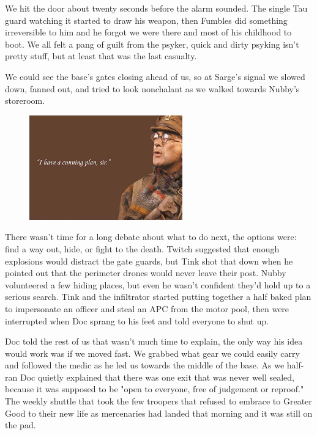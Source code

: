 We hit the door about twenty seconds before the alarm sounded. 
The single Tau guard watching it started to draw his weapon, then Fumbles did something irreversible to him and he forgot we were there and most of his childhood to boot. 
We all felt a pang of guilt from the psyker, quick and dirty psyking isn't pretty stuff, but at least that was the last casualty. 


We could see the base's gates closing ahead of us, so at Sarge's signal we slowed down, fanned out, and tried to look nonchalant as we walked towards Nubby's storeroom. 


\begin{figure}
	\begin{center}
		\includegraphics[width=\figwidth]{pics/10/53.png}
	\end{center}
\end{figure}
There wasn't time for a long debate about what to do next, the options were: 
find a way out, hide, or fight to the death. 
Twitch suggested that enough explosions would distract the gate guards, but Tink shot that down when he pointed out that the perimeter drones would never leave their post. 
Nubby volunteered a few hiding places, but even he wasn't confident they'd hold up to a serious search. 
Tink and the infiltrator started putting together a half baked plan to impersonate an officer and steal an APC from the motor pool, then were interrupted when Doc sprang to his feet and told everyone to shut up.

Doc told the rest of us that wasn't much time to explain, the only way his idea would work was if we moved fast. 
We grabbed what gear we could easily carry and followed the medic as he led us towards the middle of the base. 
As we half-ran Doc quietly explained that there was one exit that was never well sealed, because it was supposed to be "open to everyone, free of judgement or reproof." The weekly shuttle that took the few troopers that refused to embrace to Greater Good to their new life as mercenaries had landed that morning and it was still on the pad.

